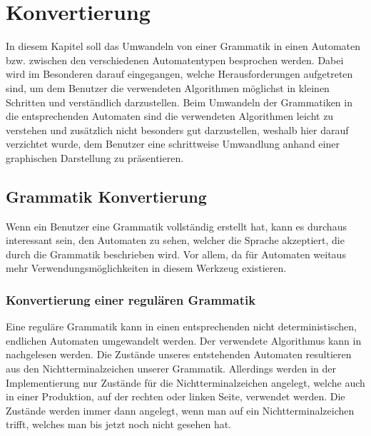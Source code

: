 

\chapter{Konvertierung}\label{ConverTo}

In diesem Kapitel soll das Umwandeln von einer Grammatik in einen Automaten
bzw. zwischen den verschiedenen Automatentypen besprochen werden. Dabei wird
im Besonderen darauf eingegangen, welche Herausforderungen aufgetreten sind, um
dem Benutzer die verwendeten Algorithmen möglichst in kleinen Schritten und
verständlich darzustellen. Beim Umwandeln der Grammatiken in die entsprechenden
Automaten sind die verwendeten Algorithmen leicht zu verstehen und zusätzlich
nicht besonders gut darzustellen, weshalb hier darauf verzichtet wurde, dem
Benutzer eine schrittweise Umwandlung anhand einer graphischen Darstellung zu
präsentieren.\vspace{10pt}


\section{Grammatik Konvertierung}\label{ConverToGrammar}

Wenn ein Benutzer eine Grammatik vollständig erstellt hat, kann es durchaus
interessant sein, den Automaten zu sehen, welcher die Sprache akzeptiert, die
durch die Grammatik beschrieben wird. Vor allem, da für Automaten weitaus mehr
Verwendungsmöglichkeiten in diesem Werkzeug existieren.\vspace{10pt}

\subsection{Konvertierung einer regulären Grammatik}\label{ConverToGrammarRegular}

Eine reguläre Grammatik kann in einen entsprechenden nicht deterministischen,
endlichen Automaten umgewandelt werden. Der verwendete Algorithmus kann in
\cite{Compilers} nachgelesen werden. Die Zustände unseres entstehenden Automaten
resultieren aus den Nichtterminalzeichen unserer Grammatik. Allerdings werden in
der Implementierung nur Zustände für die Nichtterminalzeichen angelegt, welche
auch in einer Produktion, auf der rechten oder linken Seite, verwendet werden.
Die Zustände werden immer dann angelegt, wenn man auf ein Nichtterminalzeichen
trifft, welches man bis jetzt noch nicht gesehen hat.\vspace{10pt}

